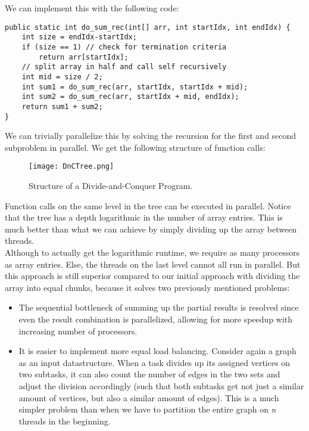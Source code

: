 \documentclass[main.tex]{subfiles}
\begin{document}
\noindent We can implement this with the following code:
\begin{verbatim}
public static int do_sum_rec(int[] arr, int startIdx, int endIdx) {
    int size = endIdx-startIdx;
    if (size == 1) // check for termination criteria
        return arr[startIdx];
    // split array in half and call self recursively
    int mid = size / 2;
    int sum1 = do_sum_rec(arr, startIdx, startIdx + mid);
    int sum2 = do_sum_rec(arr, startIdx + mid, endIdx);
    return sum1 + sum2;
}
\end{verbatim}
\noindent We can trivially parallelize this by solving the recursion for the first and second subproblem in parallel. We get the following structure of function calls:
\begin{figure}[H]
    \centering
    \texttt{[image: DnCTree.png]}
    \caption{Structure of a Divide-and-Conquer Program.}
\end{figure}
\noindent Function calls on the same level in the tree can be executed in parallel. Notice that the tree has a depth logarithmic in the number of array entries. This is much better than what we can achieve by simply dividing up the array between threads.\\
Although to actually get the logarithmic runtime, we require as many processors as array entries. Else, the threads on the last level cannot all run in parallel.  But this approach is still superior compared to our initial approach with dividing the array into equal chunks, because it solves two previously mentioned problems:
\begin{itemize}
  \item The sequential bottleneck of summing up the partial results is resolved since even the result combination is parallelized, allowing for more speedup with increasing number of processors.
  \item It is easier to implement more equal load balancing. Consider again a graph as an input datastructure. When a task divides up its assigned vertices on two subtasks, it can also count the number of edges in the two sets and adjust the division accordingly (such that both subtasks get not just a similar amount of vertices, but also a similar amount of edges). This is a much simpler problem than when we have to partition the entire graph on \textit{n} threads in the beginning.
\end{itemize}

\newpage
\end{document}
